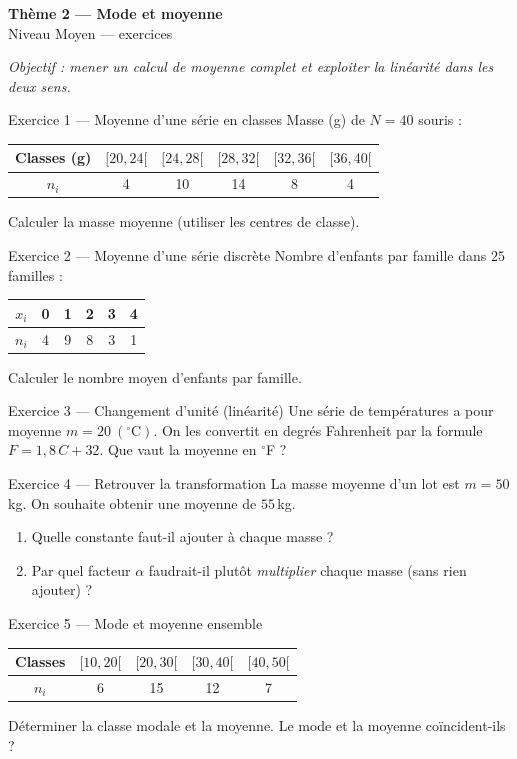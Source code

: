 \documentclass[11pt,a4paper]{article}
\newcommand{\bandeau}[2]{%
\begin{tcolorbox}[boxbase,colback=primary,colframe=primarydark,halign=center,
   before skip=2pt,after skip=12pt]
{\LARGE\bfseries\color{white} #1}\\[3pt]{\normalsize\color{white} #2}
\end{tcolorbox}}
\begin{document}
\bandeau{Thème 2 — Mode et moyenne}{Niveau Moyen — exercices}

\noindent\textit{Objectif : mener un calcul de moyenne complet et exploiter la linéarité dans les
deux sens.}\medskip

\begin{exobox}{Exercice 1 — Moyenne d'une série en classes}
Masse (g) de $N=40$ souris :
\begin{center}
\begin{tabular}{|c|c|c|c|c|c|}
\hline
Classes (g) & $[20,24[$ & $[24,28[$ & $[28,32[$ & $[32,36[$ & $[36,40[$ \\\hline
$n_i$ & 4 & 10 & 14 & 8 & 4 \\\hline
\end{tabular}
\end{center}
Calculer la masse moyenne (utiliser les centres de classe).
\end{exobox}

\begin{exobox}{Exercice 2 — Moyenne d'une série discrète}
Nombre d'enfants par famille dans $25$ familles :
\begin{center}
\begin{tabular}{|c|c|c|c|c|c|}
\hline
$x_i$ & 0 & 1 & 2 & 3 & 4 \\\hline
$n_i$ & 4 & 9 & 8 & 3 & 1 \\\hline
\end{tabular}
\end{center}
Calculer le nombre moyen d'enfants par famille.
\end{exobox}

\begin{exobox}{Exercice 3 — Changement d'unité (linéarité)}
Une série de températures a pour moyenne $m=20\ (^\circ\mathrm{C})$. On les convertit en degrés
Fahrenheit par la formule $F=1{,}8\,C+32$. Que vaut la moyenne en $^\circ$F ?
\end{exobox}

\begin{exobox}{Exercice 4 — Retrouver la transformation}
La masse moyenne d'un lot est $m=50$\,kg. On souhaite obtenir une moyenne de $55$\,kg.
\begin{enumerate}[label=\textbf{(\alph*)}]
  \item Quelle constante faut-il ajouter à chaque masse ?
  \item Par quel facteur $\alpha$ faudrait-il plutôt \emph{multiplier} chaque masse (sans rien ajouter) ?
\end{enumerate}
\end{exobox}

\begin{exobox}{Exercice 5 — Mode et moyenne ensemble}
\begin{center}
\begin{tabular}{|c|c|c|c|c|}
\hline
Classes & $[10,20[$ & $[20,30[$ & $[30,40[$ & $[40,50[$ \\\hline
$n_i$ & 6 & 15 & 12 & 7 \\\hline
\end{tabular}
\end{center}
Déterminer la classe modale et la moyenne. Le mode et la moyenne coïncident-ils ?
\end{exobox}
\end{document}

